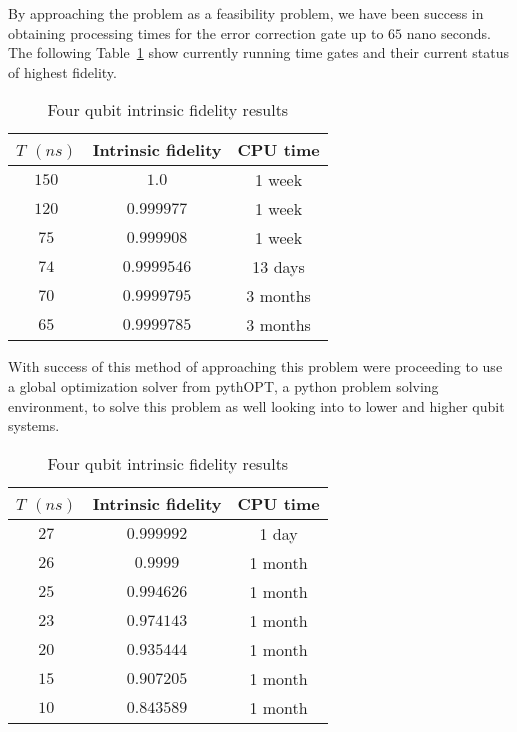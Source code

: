 By approaching the problem as a feasibility problem, we have been success in obtaining processing times for the error correction gate up to $65$ nano seconds. The following Table~\ref{tab:4 qubit results} show currently running time gates and their current status of highest fidelity.  

\begin{table}[H]
    \caption{Four qubit intrinsic fidelity results}
    \centering
    \begin{tabular}{c|c|c}
    \hline  $T$ $(ns)$  & Intrinsic fidelity & CPU time \\
    \hline
    $150$ &$1.0$      &1 week\\
    $120$ &$0.999977$ &1 week \\
    $75$  &$0.999908$ &1 week\\
    $74$  & $0.9999546$ & 13 days\\
    $70$  & $0.9999795$ & 3 months \\
    $65$  & $0.9999785$ & 3 months \\ \hline

    \end{tabular}
    \label{tab:4 qubit results}
\end{table}

With success of this method of approaching this problem were proceeding to use a global optimization solver from pythOPT, a python problem solving environment, to solve this problem as well looking into to lower and higher qubit systems. 


\begin{table}[H]
    \caption{Four qubit intrinsic fidelity results}
    \centering
    \begin{tabular}{c|c|c}
    \hline  $T$ $(ns)$  & Intrinsic fidelity & CPU time \\
    \hline
    $27$  & $0.999992$ &1 day \\
    $26$  & $0.9999  $ &1 month\\
    $25$  & $0.994626$ &1 month\\
    $23$  & $0.974143$ & 1 month \\
    $20$  & $0.935444$ & 1 month\\
    $15$  & $0.907205$ & 1 month\\
    $10$  & $0.843589$ & 1 month \\ \hline


    \end{tabular}
    \label{tab:3 qubit results}
\end{table}

